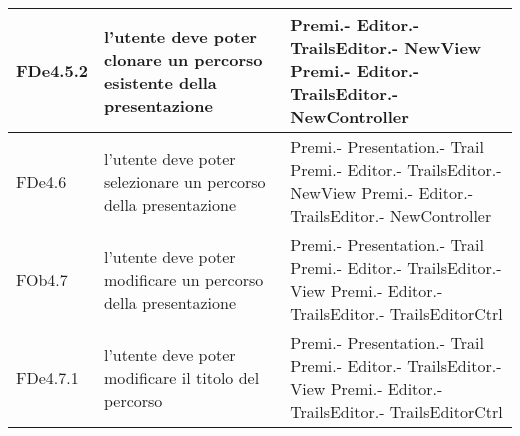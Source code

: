 \begin{longtable}{|l|p{5cm}|p{7cm}|}
\hline
FDe4.5.2 & l'utente deve poter clonare un percorso esistente della presentazione & Premi.- \linebreak Editor.- \linebreak TrailsEditor.- \linebreak NewView \linebreak Premi.- \linebreak Editor.- \linebreak TrailsEditor.- \linebreak NewController \linebreak \\
\hline
FDe4.6 & l'utente deve poter selezionare un percorso della presentazione & Premi.- \linebreak Presentation.- \linebreak Trail \linebreak Premi.- \linebreak Editor.- \linebreak TrailsEditor.- \linebreak NewView \linebreak Premi.- \linebreak Editor.- \linebreak TrailsEditor.- \linebreak NewController \linebreak \\
\hline
FOb4.7 & l'utente deve poter modificare un percorso della presentazione & Premi.- \linebreak Presentation.- \linebreak Trail \linebreak Premi.- \linebreak Editor.- \linebreak TrailsEditor.- \linebreak View \linebreak Premi.- \linebreak Editor.- \linebreak TrailsEditor.- \linebreak TrailsEditorCtrl \linebreak \\
\hline
FDe4.7.1 & l'utente deve poter modificare il titolo del percorso & Premi.- \linebreak Presentation.- \linebreak Trail \linebreak Premi.- \linebreak Editor.- \linebreak TrailsEditor.- \linebreak View \linebreak Premi.- \linebreak Editor.- \linebreak TrailsEditor.- \linebreak TrailsEditorCtrl \linebreak \\

\end{longtable}
